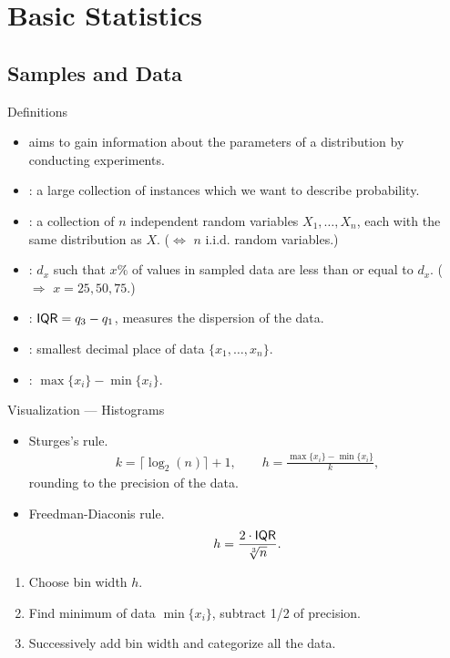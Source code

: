 \section{Basic Statistics}

\subsection{Samples and Data}


\begin{frame}{Definitions}

\justifying
\begin{itemize}
	\justifying
	\item {} aims to gain information about the parameters of a distribution by conducting experiments.
	\item {}: a large collection of instances which we want to describe probability.
	\item {}: a collection of $n$ independent random variables $X_1, \ldots, X_n$, each with the same distribution as $X$. ($\Leftrightarrow$ $n$ i.i.d. random variables.)
	\item {}: $d_x$ such that $x\%$ of values in sampled data are less than or equal to $d_x$. ( $\Rightarrow$ $x = 25, 50, 75$.)
	\item {}: $\mathsf{IQR} = q_3 - q_1$, measures the dispersion of the data.
	\item {}: smallest decimal place of data $\{x_1, \ldots, x_n\}$.
	\item {}: $\max\{x_i\} - \min\{x_i\}$.
\end{itemize}


\end{frame}


\begin{frame}{Visualization --- Histograms}

\begin{itemize}
	\item Sturges's rule.
	\begin{align*}
	k = \lceil \log_2(n)\rceil + 1, \qquad h = \frac{\max\{x_i\} - \min\{x_i\}}{k},
	\end{align*}
	rounding  to the precision of the data.
	\item Freedman-Diaconis rule.
	\begin{align*}
	h = \frac{2\cdot \mathsf{IQR}}{\sqrt[3]{n}}.
	\end{align*}
\end{itemize}
\begin{enumerate}
	\item Choose bin width $h$.
	\item Find minimum of data $\min\{x_i\}$, subtract 1/2 of precision.
	\item Successively add bin width and categorize all the data.
\end{enumerate}

\end{frame}


